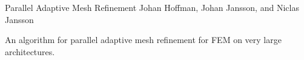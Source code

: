               {Parallel Adaptive Mesh Refinement}
              {Johan Hoffman, Johan Jansson, and Niclas Jansson}

\editornote{[hoffman-4]}

An algorithm for parallel adaptive mesh refinement for FEM on very large 
architectures.
